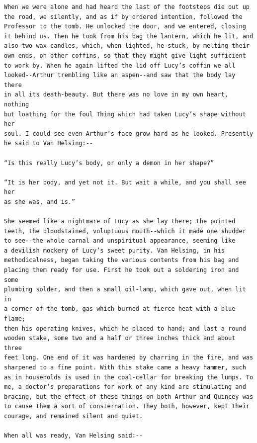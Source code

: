 \documentclass{article}
\begin{document}
\begin{verbatim}
When we were alone and had heard the last of the footsteps die out up
the road, we silently, and as if by ordered intention, followed the
Professor to the tomb. He unlocked the door, and we entered, closing
it behind us. Then he took from his bag the lantern, which he lit, and
also two wax candles, which, when lighted, he stuck, by melting their
own ends, on other coffins, so that they might give light sufficient
to work by. When he again lifted the lid off Lucy’s coffin we all
looked--Arthur trembling like an aspen--and saw that the body lay there
in all its death-beauty. But there was no love in my own heart, nothing
but loathing for the foul Thing which had taken Lucy’s shape without her
soul. I could see even Arthur’s face grow hard as he looked. Presently
he said to Van Helsing:--

“Is this really Lucy’s body, or only a demon in her shape?”

“It is her body, and yet not it. But wait a while, and you shall see her
as she was, and is.”

She seemed like a nightmare of Lucy as she lay there; the pointed
teeth, the bloodstained, voluptuous mouth--which it made one shudder
to see--the whole carnal and unspiritual appearance, seeming like
a devilish mockery of Lucy’s sweet purity. Van Helsing, in his
methodicalness, began taking the various contents from his bag and
placing them ready for use. First he took out a soldering iron and some
plumbing solder, and then a small oil-lamp, which gave out, when lit in
a corner of the tomb, gas which burned at fierce heat with a blue flame;
then his operating knives, which he placed to hand; and last a round
wooden stake, some two and a half or three inches thick and about three
feet long. One end of it was hardened by charring in the fire, and was
sharpened to a fine point. With this stake came a heavy hammer, such
as in households is used in the coal-cellar for breaking the lumps. To
me, a doctor’s preparations for work of any kind are stimulating and
bracing, but the effect of these things on both Arthur and Quincey was
to cause them a sort of consternation. They both, however, kept their
courage, and remained silent and quiet.

When all was ready, Van Helsing said:--


\end{verbatim}
\end{document}
